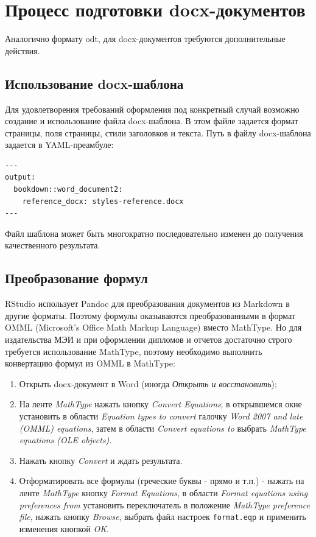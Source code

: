 \documentclass[
  a4paper,
]{book}
\providecommand{\tightlist}{%
  \setlength{\itemsep}{0pt}\setlength{\parskip}{0pt}}
\theoremstyle{definition}
\theoremstyle{definition}
\theoremstyle{definition}
\theoremstyle{definition}
\theoremstyle{remark}
\begin{document}
\section{Процесс подготовки docx-документов}\label{authoring-docx}

Аналогично формату odt, для docx-документов требуются дополнительные действия.

\subsection{Использование docx-шаблона}\label{authoring-docx-template}

Для удовлетворения требований оформления под конкретный случай возможно создание и использование файла docx-шаблона. В этом файле задается формат страницы, поля страницы, стили заголовков и текста. Путь в файлу docx-шаблона задается в YAML-преамбуле:

\begin{verbatim}
---
output:
  bookdown::word_document2:
    reference_docx: styles-reference.docx
---
\end{verbatim}

Файл шаблона может быть многократно последовательно изменен до получения качественного результата.

\subsection{Преобразование формул}\label{authoring-docx-math}

RStudio использует Pandoc для преобразования документов из Markdown в другие форматы. Поэтому формулы оказываются преобразованными в формат OMML (Microsoft's Office Math Markup Language) вместо MathType. Но для издательства МЭИ и при оформлении дипломов и отчетов достаточно строго требуется использование MathType, поэтому необходимо выполнить конвертацию формул из OMML в MathType:

\begin{enumerate}
\def\labelenumi{\arabic{enumi}.}
\tightlist
\item
  Открыть docx-документ в Word (иногда \emph{Открыть и восстановить});
\item
  На ленте \emph{MathType} нажать кнопку \emph{Convert Equations};
  в открывшемся окне установить в области \emph{Equation types to convert} галочку \emph{Word 2007 and late (OMML) equations}, затем в области \emph{Convert equations to} выбрать \emph{MathType equations (OLE objects)}.
\item
  Нажать кнопку \emph{Convert} и ждать результата.
\item
  Отформатировать все формулы (греческие буквы - прямо и т.п.) - нажать на ленте \emph{MathType} кнопку \emph{Format Equations}, в области \emph{Format equations using preferences from} установить переключатель в положение \emph{MathType preference file}, нажать кнопку \emph{Browse}, выбрать файл настроек \texttt{format.eqp} и применить изменения кнопкой \emph{OK}.
\end{enumerate}
\end{document}
